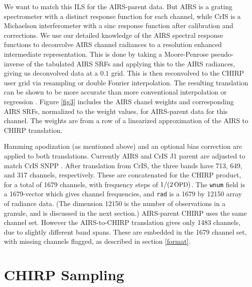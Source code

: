 \documentclass[12pt]{article}
\begin{document}
We want to match this ILS for the AIRS-parent data.  But AIRS is a
grating spectrometer with a distinct response function for each
channel, while CrIS is a Michaelson interferometer with a sinc
response function after calibration and corrections.  We use our
detailed knowledge of the AIRS spectral response functions to
deconvolve AIRS channel radiances to a resolution enhanced
intermediate representation.  This is done by taking a Moore-Penrose
pseudo-inverse of the tabulated AIRS SRFs and applying this to the
AIRS radiances, giving us deconvolved data at a $0.1$ {\wn} grid.
This is then reconvolved to the CHIRP user grid via resampling or
double Fourier interpolation.  The resulting translation can be
shown to be more accurate than more conventional interpolation or
regression \cite{mott2018}.  Figure \ref{fig3} includes the AIRS
chanel weights and corresponding AIRS SRFs, normalized to the weight
values, for AIRS-parent data for this channel.  The weights are from
a row of a linearized approximation of the AIRS to CHIRP translation.

Hamming apodization (as mentioned above) and an optional bias
correction are applied to both translations.  Currently AIRS and
CrIS J1 parent are adjusted to match CrIS SNPP \cite{strow2020a}.
After translation from CrIS, the three bands have 713, 649, and 317
channels, respectively.  These are concatenated for the CHIRP
product, for a total of 1679 channels, with frequency steps of $1/(2
\,\mbox{\small OPD})$.  The \texttt{wnum} field is a 1679-vector which gives
channel frequencies, and \texttt{rad} is a 1679 by 12150 array of
radiance data.  (The dimension 12150 is the number of observations
in a granule, and is discussed in the next section.)  AIRS-parent
CHIRP uses the same channel set.  However the AIRS-to-CHIRP
translation gives only 1483 channels, due to slightly different band
spans.  These are embedded in the 1679 channel set, with missing
channels flagged, as described in section \ref{format}.

\section{CHIRP Sampling}
\label{sampling}
\end{document}
